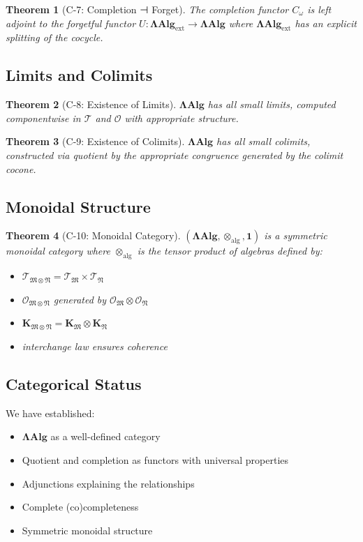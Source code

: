 \documentclass[12pt, oneside]{article}
\newtheorem{theorem}{Theorem}[section]
\newcommand{\K}{\mathbf{K}}
\newcommand{\T}{\mathcal{T}}
\newcommand{\Opr}{\mathcal{O}}
\newcommand{\mf}[1]{\mathfrak{#1}}
\begin{document}
\begin{theorem}[C-7: Completion ⊣ Forget]
The completion functor $C_\omega$ is left adjoint to the forgetful functor $U: \mathbf{ΛAlg}_{\text{ext}} \rightarrow \mathbf{ΛAlg}$ where $\mathbf{ΛAlg}_{\text{ext}}$ has an explicit splitting of the cocycle.
\end{theorem}

\subsection{Limits and Colimits}

\begin{theorem}[C-8: Existence of Limits]
$\mathbf{ΛAlg}$ has all small limits, computed componentwise in $\T$ and $\Opr$ with appropriate structure.
\end{theorem}

\begin{theorem}[C-9: Existence of Colimits]
$\mathbf{ΛAlg}$ has all small colimits, constructed via quotient by the appropriate congruence generated by the colimit cocone.
\end{theorem}

\subsection{Monoidal Structure}

\begin{theorem}[C-10: Monoidal Category]
$(\mathbf{ΛAlg}, \otimes_{\text{alg}}, \mathbf{1})$ is a symmetric monoidal category where $\otimes_{\text{alg}}$ is the tensor product of algebras defined by:
\begin{itemize}
    \item $\T_{\mf{M} \otimes \mf{N}} = \T_{\mf{M}} \times \T_{\mf{N}}$
    \item $\Opr_{\mf{M} \otimes \mf{N}}$ generated by $\Opr_{\mf{M}} \otimes \Opr_{\mf{N}}$
    \item $\K_{\mf{M} \otimes \mf{N}} = \K_{\mf{M}} \otimes \K_{\mf{N}}$
    \item interchange law ensures coherence
\end{itemize}
\end{theorem}

\subsection{Categorical Status}

We have established:
\begin{itemize}
    \item $\mathbf{ΛAlg}$ as a well-defined category
    \item Quotient and completion as functors with universal properties
    \item Adjunctions explaining the relationships
    \item Complete (co)completeness
    \item Symmetric monoidal structure
\end{itemize}
\end{document}
